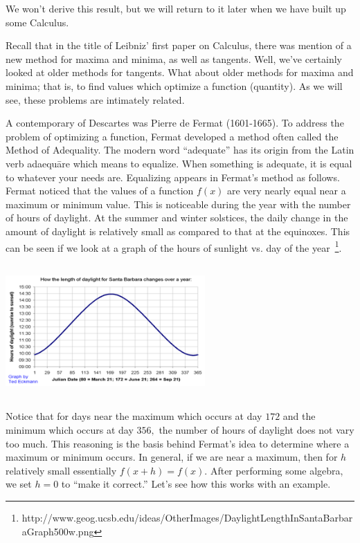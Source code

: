 We won't derive this result, but we will return to it later when we
have built up some Calculus.

Recall that in the title of Leibniz' first paper on Calculus, there was
mention of a new method for maxima and minima, as well as tangents.
Well, we've certainly looked at older methods for tangents.  What
about older methods for maxima and minima; that is, to find values
which optimize a function (quantity).  As we will see, these problems
are intimately related.

A contemporary of 
Descartes was Pierre de Fermat
(1601-1665).  To address the problem of optimizing a function, Fermat
developed a method often called the Method of Adequality.  The modern
word ``adequate'' has its origin from the Latin verb adaequāre which
means to equalize.  When something is adequate,  it is
 equal to whatever your needs are.   Equalizing appears
in Fermat's method as follows.  Fermat noticed that the values of a
function $f(x)$ are very nearly equal near a maximum or minimum value.
This is noticeable during the year with the number of hours of
daylight.  At the summer and winter solstices, the daily change in the
amount of daylight is relatively small as compared to that at the
equinoxes.  This can be seen if we look at a graph of
the hours of sunlight vs. day of the year~\footnote{http://www.geog.ucsb.edu/ideas/OtherImages/DaylightLengthInSantaBarbaraGraph500w.png}.

\centerline{\includegraphics*[height=2in,width=3in]{Figures/SantaBarbaraDaylight}}


Notice that for days near the maximum which occurs at day $172$ and
the minimum which occurs at day $356,$ the number of hours of daylight
does not vary too much.  This reasoning is the basis behind Fermat's
idea to determine where a maximum or minimum occurs.  In general, if we
are near a maximum, then for $h$ relatively small essentially $f(x+h)=f(x).$ After
performing some algebra, we set $h=0$ to ``make it correct.''  Let's
see how this works with an example.

